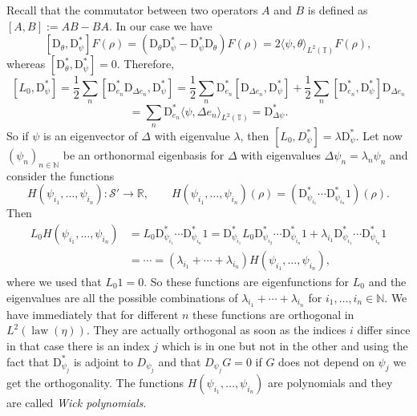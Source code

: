 \documentclass[a4paper,11pt]{article}
\newcommand{\assign}{:=}
\newcommand{\mathD}{\mathrm{D}}
\newcommand{\tmop}[1]{\ensuremath{\operatorname{#1}}}
\newcommand{\tmtextit}[1]{{\itshape{#1}}}
\newcommand{\CS}{\mathscr{S}}
\begin{document}
Recall that the commutator between two operators $A$ and $B$ is defined as $[A,B] \assign AB - BA$. In our case we have
\[ [\mathD_{\theta}, \mathD^{\ast}_{\psi}] F (\rho) = (\mathD_{\theta}
   \mathD^{\ast}_{\psi} - \mathD^{\ast}_{\psi} \mathD_{\theta}) F (\rho) = 2
   \langle \psi, \theta \rangle_{L^2 (\mathbb{T})} F (\rho), \]
whereas $[\mathD^{\ast}_{\theta}, \mathD^{\ast}_{\psi}] = 0$. Therefore,
\[ [L_0, \mathD^{\ast}_{\psi}] = \frac{1}{2} \sum_n [\mathD^{\ast}_{e_n}
   \mathD_{\Delta e_n}, \mathD^{\ast}_{\psi}] = \frac{1}{2} \sum_n
   \mathD^{\ast}_{e_n} [\mathD_{\Delta e_n}, \mathD^{\ast}_{\psi}] +
   \frac{1}{2} \sum_n [\mathD^{\ast}_{e_n}, \mathD^{\ast}_{\psi}]
   \mathD_{\Delta e_n} \]
\[ = \sum_n \mathD^{\ast}_{e_n} \langle \psi, \Delta e_n \rangle_{L^2
   (\mathbb{T})} = \mathD^{\ast}_{\Delta \psi} . \]
So if $\psi$ is an eigenvector of $\Delta$ with eigenvalue $\lambda$, then
$[L_0, D^{\ast}_{\psi}] = \lambda \mathD^{\ast}_{\psi}$. Let now $(\psi_n)_{n
\in \mathbb{N}}$ be an orthonormal eigenbasis for $\Delta$ with eigenvalues
$\Delta \psi_n = \lambda_n \psi_n$ and consider the functions
\[ H (\psi_{i_1}, \ldots, \psi_{i_n}) : \CS' \rightarrow \mathbb{R},
   \hspace{2em} H (\psi_{i_1}, \ldots, \psi_{i_n}) (\rho) = (
   \mathD^{\ast}_{\psi_{i_1}} \cdots \mathD^{\ast}_{\psi_{i_n}} 1 )
   (\rho) . \]
Then
\begin{align}\label{eq:L0-eigenvalues}
   L_0 H (\psi_{i_1}, \ldots, \psi_{i_n}) & = L_0 \mathD^{\ast}_{\psi_{i_1}} \cdots \mathD^{\ast}_{\psi_{i_n}} 1 =  \mathD^{\ast}_{\psi_{i_1}} L_0 \mathD^{\ast}_{\psi_{i_2}} \cdots \mathD^{\ast}_{\psi_{i_n}} 1 + \lambda_{i_1} \mathD^{\ast}_{\psi_{i_1}} \cdots \mathD^{\ast}_{\psi_{i_n}} 1 \\ \nonumber
  & = \cdots = (\lambda_{i_1} + \cdots + \lambda_{i_n}) H (\psi_{i_1}, \ldots,
   \psi_{i_n}),
\end{align}
where we used that $L_0 1 = 0$. So these functions are eigenfunctions for
$L_0$ and the eigenvalues are all the possible combinations of $\lambda_{i_1}
+ \cdots + \lambda_{i_n}$ for $i_1, \ldots, i_n \in \mathbb{N}$. We have
immediately that for different $n$ these functions are orthogonal in $L^2
(\tmop{law} (\eta))$. They are actually orthogonal as soon as the indices $i$
differ since in that case there is an index $j$ which is in one but not in the
other and using the fact that $\mathD^{\ast}_{\psi_j}$ is adjoint to
$D_{\psi_j}$ and that $D_{\psi_j} G = 0$ if $G$ does not depend on $\psi_j$ we
get the orthogonality. The functions $H (\psi_{i_1}, \ldots, \psi_{i_n})$ are
polynomials and they are called \tmtextit{Wick polynomials}.
\end{document}
